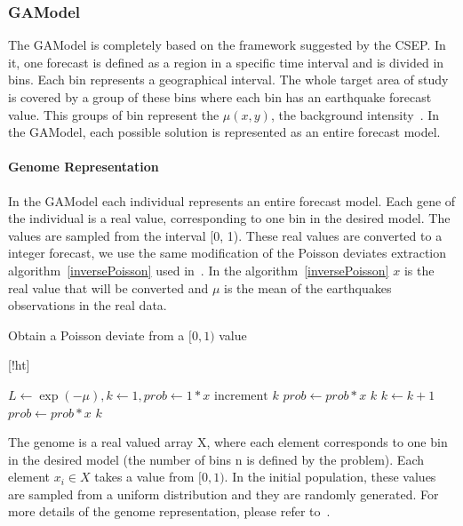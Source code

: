 \subsubsection{GAModel}\label{GAModel}
The GAModel is completely based on the framework suggested by the CSEP. In it, one forecast is defined as a region in a specific time interval and is divided in bins. Each bin represents a geographical interval. The whole target area of study is covered by a group of these bins where each bin has an earthquake forecast value. This groups of bin represent the $\mu(x,y)$, the background intensity~\cite{zhuang2004analyzing}. In the GAModel, each possible solution is represented as an entire forecast model.

\paragraph{Genome Representation}\label{genomeGA}
In the GAModel each individual represents an entire forecast model. Each gene of the individual is a real value, corresponding to one bin in the desired model. The values are sampled from the interval [0, 1). These real values are converted to a integer forecast, we use the same modification of the Poisson deviates extraction algorithm~\ref{inversePoisson} used in~\cite{ecta14}. In the algorithm~\ref{inversePoisson} $x$ is the real value that will be converted and $\mu$ is the mean of the earthquakes observations in the real data.

\begin{algorithm}\label{inversePoisson}
  \caption{Obtain a Poisson deviate from a $[0,1)$ value}
  \label{InversePoisson}[!ht]
  \begin{algorithmic}
    \STATE $L \gets \exp{(-\mu)}, k \gets 1, prob \gets 1 * x$
    \REPEAT 
    \STATE $\text{increment }k$
    \STATE $prob \gets prob*x$
    \RETURN $k$
		\STATE $k \gets k + 1$
	    \STATE $prob \gets prob*x$
	\ENDWHILE
    \RETURN $k$
  \end{algorithmic}
\end{algorithm}

The genome is a real valued array X, where each element corresponds to one bin in the desired model (the number of bins n is defined by the problem). Each element $x_i \in X$ takes a value from $[0,1)$. In the initial population, these values are sampled from a uniform distribution and they are randomly generated. For more details of the genome representation, please refer to~\cite{ecta14}.

